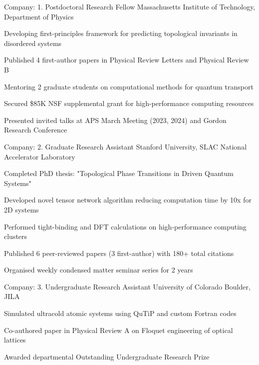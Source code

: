 

\begin{cventries}


\cventry
{Company:}
{1. Postdoctoral Research Fellow}
{Massachusetts Institute of Technology, Department of Physics}
{}
{
\begin{cvitems}

\item {Developing first-principles framework for predicting topological invariants in disordered systems}

\item {Published 4 first-author papers in Physical Review Letters and Physical Review B}

\item {Mentoring 2 graduate students on computational methods for quantum transport}

\item {Secured \$85K NSF supplemental grant for high-performance computing resources}

\item {Presented invited talks at APS March Meeting (2023, 2024) and Gordon Research Conference}

\end{cvitems}
}


\cventry
{Company:}
{2. Graduate Research Assistant}
{Stanford University, SLAC National Accelerator Laboratory}
{}
{
\begin{cvitems}

\item {Completed PhD thesis: "Topological Phase Transitions in Driven Quantum Systems"}

\item {Developed novel tensor network algorithm reducing computation time by 10x for 2D systems}

\item {Performed tight-binding and DFT calculations on high-performance computing clusters}

\item {Published 6 peer-reviewed papers (3 first-author) with 180+ total citations}

\item {Organised weekly condensed matter seminar series for 2 years}

\end{cvitems}
}


\cventry
{Company:}
{3. Undergraduate Research Assistant}
{University of Colorado Boulder, JILA}
{}
{
\begin{cvitems}

\item {Simulated ultracold atomic systems using QuTiP and custom Fortran codes}

\item {Co-authored paper in Physical Review A on Floquet engineering of optical lattices}

\item {Awarded departmental Outstanding Undergraduate Research Prize}

\end{cvitems}
}


\end{cventries}
